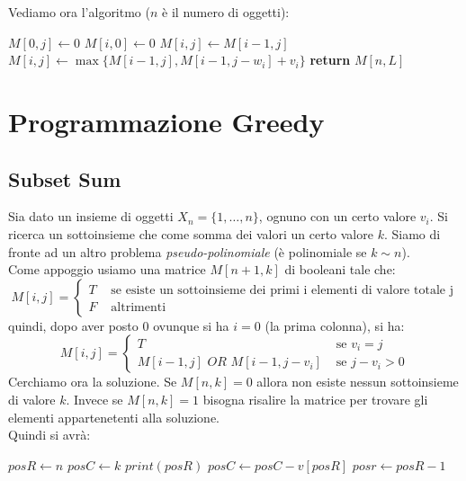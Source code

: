 \documentclass[a4paper,12pt, oneside]{book}
\begin{document}
\newpage
Vediamo ora l'algoritmo ($n$ è il numero di oggetti):
\begin{algorithm}[H]
  \begin{algorithmic}
    \State $M[0,j]\gets 0$
    \EndFor
    \State $M[i,0]\gets 0$
    \EndFor
    \State $M[i,j]\gets M[i-1,j]$
    \Else
    \State $M[i,j]\gets \max\{M[i-1,j],M[i-1,j-w_i]+v_i\}$
    \EndIf
    \EndFor
    \EndFor
    \State \textbf{return} $M[n,L]$
    \EndFunction
  \end{algorithmic}
\end{algorithm}
\chapter{Programmazione Greedy}
\section{Subset Sum}
Sia dato un insieme di oggetti $X_n=\{1,\ldots, n\}$, ognuno con un
certo valore $v_i$. Si ricerca un sottoinsieme che come somma dei
valori un certo valore $k$. Siamo di fronte ad un altro problema
\textit{pseudo-polinomiale} (è polinomiale se $k\sim n$).\\
Come appoggio usiamo una matrice $M[n+1,k]$ di booleani tale che:
\[M[i,j]=
  \begin{cases}
    T & \mbox{ se esiste un sottoinsieme dei primi i elementi di
      valore totale j}\\
    F & \mbox{ altrimenti}
  \end{cases}
\]
quindi, dopo aver posto $0$ ovunque si ha $i=0$ (la prima colonna), si
ha:
\[M[i,j]=
  \begin{cases}
    T & \mbox{ se } v_i=j\\
    M[i-1,j]\,\,OR\,\, M[i-1,j-v_i] & \mbox{ se } j-v_i>0
  \end{cases}
\]
Cerchiamo ora la soluzione. Se $M[n,k]=0$ allora non esiste nessun
sottoinsieme di valore $k$. Invece se $M[n,k]=1$ bisogna risalire la
matrice per trovare gli elementi appartenetenti alla soluzione.\\
\newpage
Quindi si avrà:
\begin{algorithm}[H]
  \begin{algorithmic}
    \State $posR\gets n$
    \State $posC\gets k$
    \State $print(posR)$
    \State $posC\gets posC - v[posR]$
    \EndIf
    \State $posr \gets posR-1$
    \EndWhile
    \EndFunction
  \end{algorithmic}
\end{algorithm}
\end{document}
